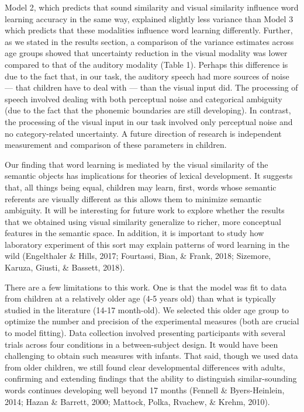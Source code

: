 \documentclass[english,,man]{apa6}
\theoremstyle{definition}
\theoremstyle{definition}
\theoremstyle{definition}
\theoremstyle{remark}
\begin{document}
Model 2, which predicts that sound similarity and visual similarity
influence word learning accuracy in the same way, explained slightly
less variance than Model 3 which predicts that these modalities
influence word learning differently. Further, as we stated in the
results section, a comparison of the variance estimates across age
groups showed that uncertainty reduction in the visual modality was
lower compared to that of the auditory modality (Table 1). Perhaps this
difference is due to the fact that, in our task, the auditory speech had
more sources of noise --- that children have to deal with --- than the
visual input did. The processing of speech involved dealing with both
perceptual noise and categorical ambiguity (due to the fact that the
phonemic boundaries are still developing). In contrast, the processing
of the visual input in our task involved only perceptual noise and no
category-related uncertainty. A future direction of research is
independent measurement and comparison of these parameters in children.

Our finding that word learning is mediated by the visual similarity of
the semantic objects has implications for theories of lexical
development. It suggests that, all things being equal, children may
learn, first, words whose semantic referents are visually different as
this allows them to minimize semantic ambiguity. It will be interesting
for future work to explore whether the results that we obtained using
visual similarity generalize to richer, more conceptual features in the
semantic space. In addition, it is important to study how laboratory
experiment of this sort may explain patterns of word learning in the
wild (Engelthaler \& Hills, 2017; Fourtassi, Bian, \& Frank, 2018;
Sizemore, Karuza, Giusti, \& Bassett, 2018).

There are a few limitations to this work. One is that the model was fit
to data from children at a relatively older age (4-5 years old) than
what is typically studied in the literature (14-17 month-old). We
selected this older age group to optimize the number and precision of
the experimental measures (both are crucial to model fitting). Data
collection involved presenting participants with several trials across
four conditions in a between-subject design. It would have been
challenging to obtain such measures with infants. That said, though we
used data from older children, we still found clear developmental
differences with adults, confirming and extending findings that the
ability to distinguish similar-sounding words continues developing well
beyond 17 months (Fennell \& Byers-Heinlein, 2014; Hazan \& Barrett,
2000; Mattock, Polka, Rvachew, \& Krehm, 2010).
\end{document}
